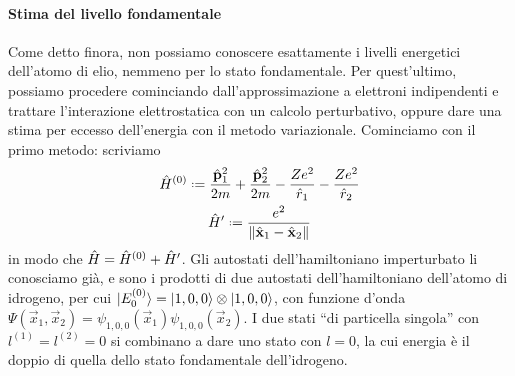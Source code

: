 \paragraph{Stima del livello fondamentale}
Come detto finora, non possiamo conoscere esattamente i livelli energetici dell'atomo di elio, nemmeno per lo stato fondamentale.
Per quest'ultimo, possiamo procedere cominciando dall'approssimazione a elettroni indipendenti e trattare l'interazione elettrostatica con un calcolo perturbativo, oppure dare una stima per eccesso dell'energia con il metodo variazionale.
Cominciamo con il primo metodo: scriviamo
\begin{equation}
    \begin{gathered}
        \op H^{(0)}\defeq\frac{\op{\vec p}_1^2}{2m}+\frac{\op{\vec p}_2^2}{2m}-\frac{Ze^2}{\op r_1}-\frac{Ze^2}{\op r_2}\\
        \op H'\defeq\frac{e^2}{\norm{\op{\vec x}_1-\op{\vec x}_2}}
    \end{gathered}
    \label{eq:scomposizione-H-elio-perturbazione}
\end{equation}
in modo che $\hat{H}=\hat{H}^{(0)}+\hat{H}'$.
Gli autostati dell'hamiltoniano imperturbato li conosciamo già, e sono i prodotti di due autostati dell'hamiltoniano dell'atomo di idrogeno, per cui $\lvert E_0^{(0)}\rangle=\lvert1,0,0\rangle\otimes\lvert1,0,0\rangle$, con funzione d'onda $\Psi(\vec x_1,\vec x_2)=\psi_{1,0,0}(\vec x_1)\psi_{1,0,0}(\vec x_2)$.
I due stati ``di particella singola'' con $l^{(1)}=l^{(2)}=0$ si combinano a dare uno stato con $l=0$, la cui energia è il doppio di quella dello stato fondamentale dell'idrogeno.

